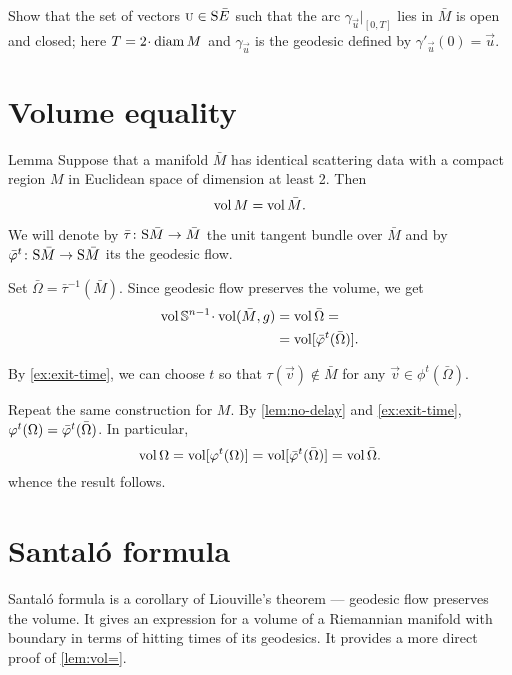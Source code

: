  Show that the set of vectors $\vec u\in\S \bar E$ such that the arc $\gamma_{\vec u}|_{[0, T]}$ lies in $\bar M$ is open and closed;
here $T=2\cdot\diam M$ and $\gamma_{\vec u}$ is the geodesic defined by $\gamma'_{\vec u}(0)=\vec u$.

\section{Volume equality}

\begin{thm}{Lemma}\label{lem:vol=}
Suppose that a manifold $\bar M$ has identical scattering data with a compact region $M$ in Euclidean space of dimension at least 2.
Then 
\[\vol M=\vol \bar M.\]

\end{thm}

We will denote by $\bar \tau\:\S \bar M\to \bar M$ the unit tangent bundle over $\bar M$
and by $\bar\phi^t\:\S \bar M\to \S \bar M$ its the geodesic flow.

Set $\bar\Omega=\bar \tau^{-1}(\bar M)$.
Since geodesic flow preserves the volume, we get 
\begin{align*}
\vol\SSS^{n-1}\cdot\vol(\bar M,g)&=\vol\bar\Omega=
\\
&=\vol[\bar\phi^t(\bar\Omega)].
\end{align*}

By \ref{ex:exit-time}, we can choose $t$ so that $\tau(\vec v)\notin \bar M$ for any $\vec v\in \phi^t(\bar\Omega)$.

Repeat the same construction for $M$. 
By \ref{lem:no-delay} and \ref{ex:exit-time}, $\phi^t(\Omega)\z=\bar\phi^t(\bar\Omega)$.
In particular, 
\[
\vol\Omega=
\vol[\phi^t(\Omega)]=
\vol[\bar\phi^t(\bar\Omega)]=
\vol\bar\Omega.
\]
whence the result follows.
\qeds

\section{Santal\'{o} formula}

Santal\'{o} formula is a corollary of Liouville's theorem --- geodesic flow preserves the volume.
It gives an expression for a volume of a Riemannian manifold with boundary in terms of hitting times of its geodesics.
It provides a more direct proof of \ref{lem:vol=}.

